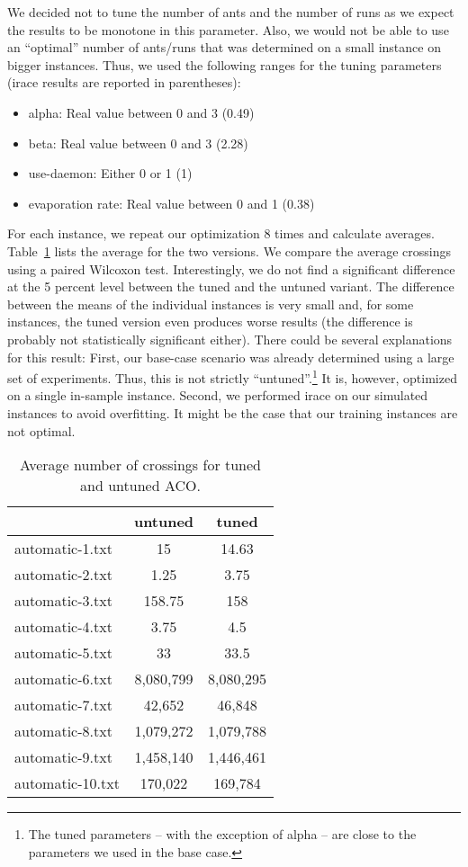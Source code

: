 \documentclass{scrartcl}
\begin{document}
We decided not to tune the number of ants and the number of runs as we
expect the results to be monotone in this parameter. Also, we would
not be able to use an ``optimal'' number of ants/runs that was
determined on a small instance on bigger instances. Thus, we used the
following ranges for the tuning parameters (irace results are reported in parentheses):

\begin{itemize}
  \item alpha: Real value between 0 and 3 (0.49)
  \item beta: Real value between 0 and 3 (2.28)
  \item use-daemon: Either 0 or 1 (1)
  \item evaporation rate: Real value between 0 and 1 (0.38)
\end{itemize}

For each instance, we repeat our optimization 8 times and calculate
averages. Table~\ref{tab:resultssim} lists the average for the two
versions.  We compare the average crossings using a paired Wilcoxon
test. Interestingly, we do not find a significant difference at the 5
percent level between the tuned and the untuned variant. The
difference between the means of the individual instances is very small
and, for some instances, the tuned version even produces worse results
(the difference is probably not statistically significant
either). There could be several explanations for this result: First,
our base-case scenario was already determined using a large set of
experiments. Thus, this is not strictly ``untuned''.\footnote{The
  tuned parameters -- with the exception of alpha -- are close to the
  parameters we used in the base case.} It is, however, optimized on a
single in-sample instance. Second, we performed irace on our simulated
instances to avoid overfitting. It might be the case that our training
instances are not optimal.


\begin{table}
\scriptsize
\begin{tabular}{lcc}
  \toprule  & untuned & tuned \\
  \midrule 
  automatic-1.txt & 15 & 14.63 \\
  automatic-2.txt & 1.25 & 3.75  \\
  automatic-3.txt & 158.75 & 158 \\
  automatic-4.txt & 3.75 & 4.5 \\
  automatic-5.txt & 33 &  33.5 \\
  automatic-6.txt & 8,080,799 & 8,080,295 \\
  automatic-7.txt & 42,652 & 46,848 \\
  automatic-8.txt & 1,079,272 & 1,079,788 \\
  automatic-9.txt & 1,458,140 & 1,446,461 \\
  automatic-10.txt & 170,022 & 169,784 \\
  \bottomrule 
\end{tabular}
\caption{Average number of crossings for tuned and untuned ACO.}
\label{tab:resultssim}
\end{table}
\end{document}
